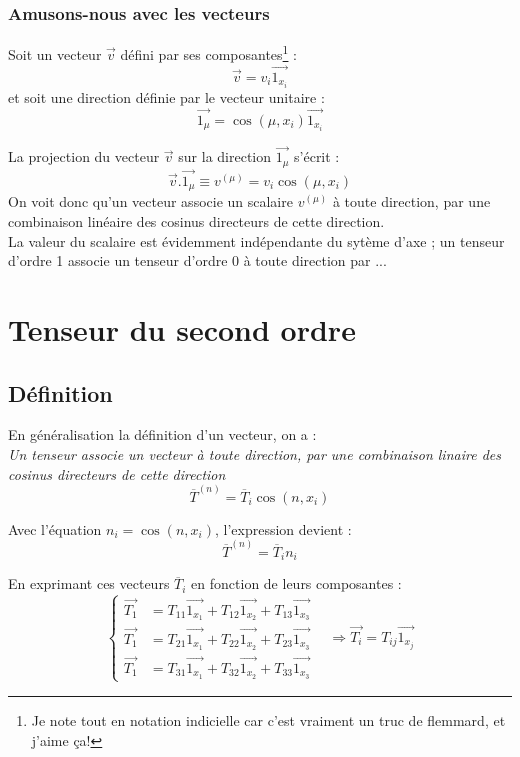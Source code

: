     
\subsubsection{Amusons-nous avec les vecteurs}
Soit un vecteur $\vec{v}$ défini par ses composantes\footnote{Je note tout en notation indicielle
car c'est vraiment un truc de flemmard, et j'aime ça!} :
\begin{equation}
	\vec{v} = v_i\vec{1_{x_i}}
\end{equation}
et soit une direction définie par le vecteur unitaire :
\begin{equation}
	\vec{1_\mu} = \cos(\mu,x_i)\vec{1_{x_i}}
\end{equation}
        
La projection du vecteur $\vec{v}$ sur la direction $\vec{1_\mu}$ s'écrit :
\begin{equation}
	\vec{v}.\vec{1_\mu} \equiv v^{(\mu)} = v_i\cos(\mu, x_i)
\end{equation}
On voit donc qu'un vecteur associe un scalaire $v^{(\mu)}$ à toute direction, par une combinaison
linéaire des cosinus directeurs de cette direction.\\
La valeur du scalaire est évidemment indépendante du sytème d'axe ; un tenseur d'ordre 1 associe un 
tenseur d'ordre 0 à toute direction par ...
        
        
        
\section{Tenseur du second ordre}
\subsection{Définition}
En généralisation la définition d'un vecteur, on a : \\
\textit{Un tenseur associe un vecteur à toute direction, par une combinaison linaire des cosinus
directeurs de cette direction}
\begin{equation}
	\overline{T}^{(n)} = \overline{T}_i\cos(n,x_i)
\end{equation}
    
Avec l'équation $n_i = \cos(n,x_i)$, l'expression devient :
\begin{equation}
	\overline{T}^{(n)} = \overline{T}_in_i
\end{equation}
    
En exprimant ces vecteurs $\overline{T}_i$ en fonction de leurs composantes :
\begin{equation}
	\left\{\begin{array}{ll}
	\vec{T_1}&= T_{11} \vec{1_{x_1}}+T_{12} \vec{1_{x_2}}+T_{13} \vec{1_{x_3}}  \\
	\vec{T_1}&= T_{21} \vec{1_{x_1}}+T_{22} \vec{1_{x_2}}+T_{23} \vec{1_{x_3}}  \\
	\vec{T_1}&= T_{31} \vec{1_{x_1}}+T_{32} \vec{1_{x_2}}+T_{33} \vec{1_{x_3}}  
	\end{array}\right.\ \ \ \ \Rightarrow \vec{T_i} = T_{ij}\vec{1_{x_j}}
\end{equation}

